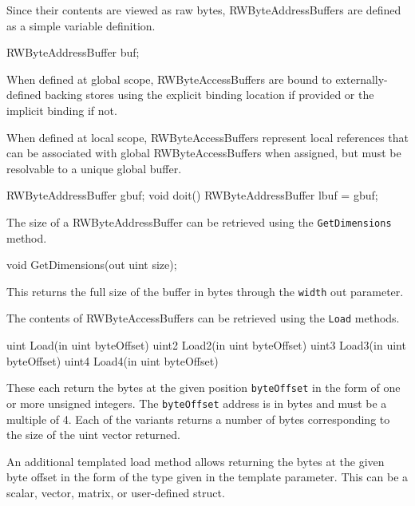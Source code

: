 
Since their contents are viewed as raw bytes, RWByteAddressBuffers are defined as a simple variable definition.
\begin{HLSL}
  RWByteAddressBuffer buf;
\end{HLSL}

When defined at global scope, RWByteAccessBuffers are bound to externally-defined backing stores
using the explicit binding location if provided or the implicit binding if not.

When defined at local scope, RWByteAccessBuffers represent local references
that can be associated with global RWByteAccessBuffers when assigned,
but must be resolvable to a unique global buffer.

\begin{HLSL}
  RWByteAddressBuffer gbuf;
  void doit() {
    RWByteAddressBuffer lbuf = gbuf;
  }
\end{HLSL}


The size of a RWByteAddressBuffer can be retrieved using the \texttt{GetDimensions} method.
\begin{HLSL}
void GetDimensions(out uint size);
\end{HLSL}

This returns the full size of the buffer in bytes through the \texttt{width} out parameter.


The contents of RWByteAccessBuffers can be retrieved using the \texttt{Load} methods.

\begin{HLSL}
 uint Load(in uint byteOffset)
 uint2 Load2(in uint byteOffset)
 uint3 Load3(in uint byteOffset)
 uint4 Load4(in uint byteOffset)
\end{HLSL}

These each return the bytes at the given position \texttt{byteOffset} in the form of one or more unsigned integers.
The \texttt{byteOffset} address is in bytes and must be a multiple of 4.
Each of the variants returns a number of bytes corresponding to the size of the uint vector returned.

An additional templated load method allows returning the bytes at the given byte offset in the form
of the type given in the template parameter. This can be a scalar, vector, matrix, or user-defined struct.

